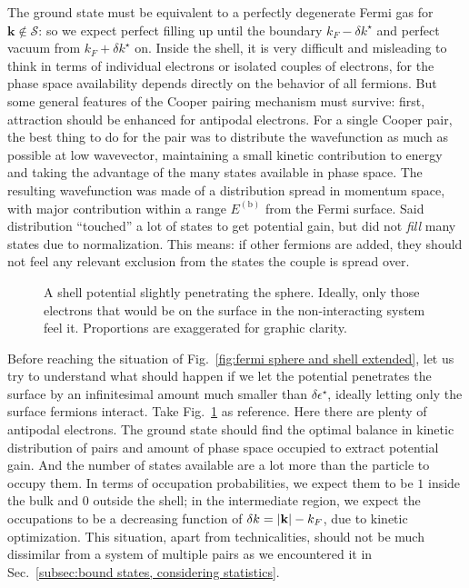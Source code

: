 The ground state must be equivalent to a perfectly degenerate Fermi gas for $\mathbf{k} \not\in \mathcal{S}$: so we expect perfect filling up until the boundary $k_F - \delta k^\star$ and perfect vacuum from $k_F + \delta k^\star$ on. Inside the shell, it is very difficult and misleading to think in terms of individual electrons or isolated couples of electrons, for the phase space availability depends directly on the behavior of all fermions. But some general features of the Cooper pairing mechanism must survive: first, attraction should be enhanced for antipodal electrons. For a single Cooper pair, the best thing to do for the pair was to distribute the wavefunction as much as possible at low wavevector, maintaining a small kinetic contribution to energy and taking the advantage of the many states available in phase space. The resulting wavefunction was made of a distribution spread in momentum space, with major contribution within a range $E^{(\mathrm{b})}$ from the Fermi surface. Said distribution ``touched'' a lot of states to get potential gain, but did not \textit{fill} many states due to normalization. This means: if other fermions are added, they should not feel any relevant exclusion from the states the couple is spread over.

\begin{figure}
	\centering
	
	\caption{A shell potential slightly penetrating the sphere. Ideally, only those electrons that would be on the surface in the non-interacting system feel it. Proportions are exaggerated for graphic clarity.}
	\label{fig:fermi sphere and shell extended first onion}
\end{figure}

Before reaching the situation of Fig.~\ref{fig:fermi sphere and shell extended}, let us try to understand what should happen if we let the potential penetrates the surface by an infinitesimal amount much smaller than $\delta\epsilon^\star$, ideally letting only the surface fermions interact. Take Fig.~\ref{fig:fermi sphere and shell extended first onion} as reference. Here there are plenty of antipodal electrons. The ground state should find the optimal balance in kinetic distribution of pairs and amount of phase space occupied to extract potential gain. And the number of states available are a lot more than the particle to occupy them.
In terms of occupation probabilities, we expect them to be $1$ inside the bulk and $0$ outside the shell; in the intermediate region, we expect the occupations to be a decreasing function of $\delta k = \abs{\mathbf{k}} - k_F$, due to kinetic optimization. This situation, apart from technicalities, should not be much dissimilar from a system of multiple pairs as we encountered it in Sec.~\ref{subsec:bound states, considering statistics}.

